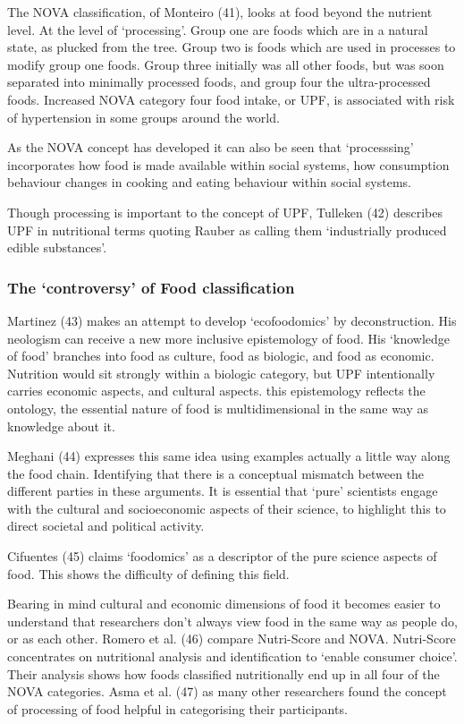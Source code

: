 \documentclass[
]{article}
\begin{document}
The NOVA classification, of Monteiro (41), looks at food beyond the
nutrient level. At the level of `processing'. Group one are foods which
are in a natural state, as plucked from the tree. Group two is foods
which are used in processes to modify group one foods. Group three
initially was all other foods, but was soon separated into minimally
processed foods, and group four the ultra-processed foods. Increased
NOVA category four food intake, or UPF, is associated with risk of
hypertension in some groups around the world.

As the NOVA concept has developed it can also be seen that `processsing'
incorporates how food is made available within social systems, how
consumption behaviour changes in cooking and eating behaviour within
social systems.

Though processing is important to the concept of UPF, Tulleken (42)
describes UPF in nutritional terms quoting Rauber as calling them
`industrially produced edible substances'.

\hypertarget{the-controversy-of-food-classification}{%
\subsubsection{The `controversy' of Food
classification}\label{the-controversy-of-food-classification}}

Martinez (43) makes an attempt to develop `ecofoodomics' by
deconstruction. His neologism can receive a new more inclusive
epistemology of food. His `knowledge of food' branches into food as
culture, food as biologic, and food as economic. Nutrition would sit
strongly within a biologic category, but UPF intentionally carries
economic aspects, and cultural aspects. this epistemology reflects the
ontology, the essential nature of food is multidimensional in the same
way as knowledge about it.

Meghani (44) expresses this same idea using examples actually a little
way along the food chain. Identifying that there is a conceptual
mismatch between the different parties in these arguments. It is
essential that `pure' scientists engage with the cultural and
socioeconomic aspects of their science, to highlight this to direct
societal and political activity.

Cifuentes (45) claims `foodomics' as a descriptor of the pure science
aspects of food. This shows the difficulty of defining this field.

Bearing in mind cultural and economic dimensions of food it becomes
easier to understand that researchers don't always view food in the same
way as people do, or as each other. Romero et al. (46) compare
Nutri-Score and NOVA. Nutri-Score concentrates on nutritional analysis
and identification to `enable consumer choice'. Their analysis shows how
foods classified nutritionally end up in all four of the NOVA
categories. Asma et al. (47) as many other researchers found the concept
of processing of food helpful in categorising their participants.
\end{document}
